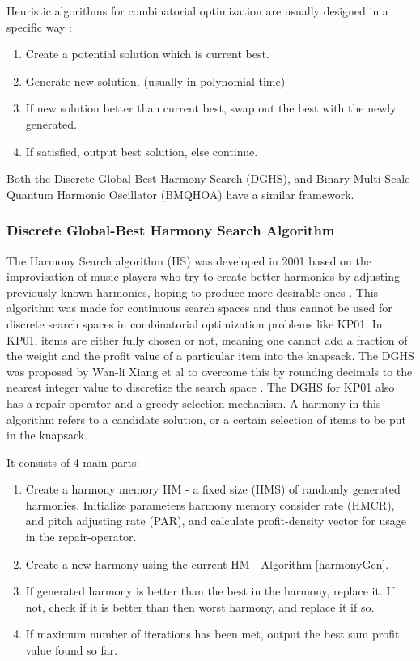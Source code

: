 \documentclass[titlepage]{article}
\begin{document}
Heuristic algorithms for combinatorial optimization are usually designed in a specific way \cite{heuristic}:
\begin{enumerate}
    \item Create a potential solution which is current best.
    \item Generate new solution. (usually in polynomial time) 
    \item If new solution better than current best, swap out the best with the newly generated. 
    \item If satisfied, output best solution, else continue.
\end{enumerate}

Both the Discrete Global-Best Harmony Search (DGHS), and Binary Multi-Scale Quantum Harmonic Oscillator (BMQHOA) have a similar framework.

\subsubsection{Discrete Global-Best Harmony Search Algorithm}
The Harmony Search algorithm (HS) was developed in 2001 based on the improvisation of music players who try to create better harmonies by adjusting previously known harmonies, hoping to produce more desirable ones \cite{geem01}. This algorithm was made for continuous search spaces and thus cannot be used for discrete search spaces in combinatorial optimization problems like KP01. In KP01, items are either fully chosen or not, meaning one cannot add a fraction of the weight and the profit value of a particular item into the knapsack. The DGHS was proposed by Wan-li Xiang et al to overcome this by rounding decimals to the nearest integer value to discretize the search space \cite{DGHS-article}. The DGHS for KP01 also has a repair-operator and a greedy selection mechanism. A harmony in this algorithm refers to a candidate solution, or a certain selection of items to be put in the knapsack. 

It consists of 4 main parts:
\begin{enumerate}
    \item Create a harmony memory HM - a fixed size (HMS) of randomly generated harmonies. Initialize parameters harmony memory consider rate (HMCR), and pitch adjusting rate (PAR), and calculate profit-density vector for usage in the repair-operator.
    \item Create a new harmony using the current HM - Algorithm \ref{harmonyGen}.
    \item If generated harmony is better than the best in the harmony, replace it. If not, check if it is better than then worst harmony, and replace it if so. 
    \item If maximum number of iterations has been met, output the best sum profit value found so far.
\end{enumerate}
\end{document}
